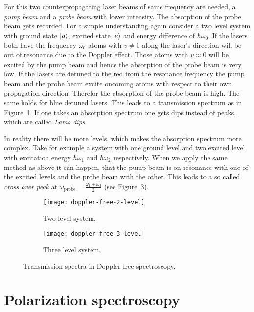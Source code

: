 \documentclass[11pt, english, fleqn, DIV=15, headinclude, BCOR=2cm]{scrreprt}
\begin{document}
For this two counterpropagating laser beams of same frequency are needed, a
\emph{pump beam} and a \emph{probe beam} with lower intensity. The absorption
of the probe beam gets recorded. For a simple understanding again consider a
two level system with ground state $\ket{g}$, excited state $\ket{e}$ and
energy difference of $\hbar\omega_0$. If the lasers both have the frequency
$\omega_0$ atoms with $v\neq0$ along the laser's direction will be out of
resonance due to the Doppler effect. Those atoms with $v\approx 0$ will be
excited by the pump beam and hence the absorption of the probe beam is very
low. If the lasers are detuned to the red from the resonance frequency the pump
beam and the probe beam excite oncoming atoms with respect to their own
propagation direction. Therefor the absorption of the probe beam is high.
The same holds for blue detuned lasers. This leads to a transmission spectrum as
in Figure~\ref{fig:doppler-free-2-level}. If one takes an absorption
spectrum one gets dips instead of peaks, which are called \emph{Lamb dips}.

In reality there will be more levels, which makes the absorption spectrum more
complex. Take for example a system with one ground level and two excited level
with excitation energy $\hbar\omega_1$ and $\hbar\omega_2$ respectively. When
we apply the same method as above it can happen, that the pump beam is on
resonance with one of the excited levels and the probe beam with the other.
This leads to a so called \emph{cross over peak} at $\omega_\text{probe} =
\frac{\omega_1+\omega_2}2$ (see Figure~\ref{fig:doppler-free-3-level}).

\begin{figure}
    \begin{subfigure}{.5\textwidth}
        \centering
        \texttt{[image: doppler-free-2-level]}
        \caption{%
            Two level system.
        }
        \label{fig:doppler-free-2-level}
    \end{subfigure}
    \hfill
    \begin{subfigure}{.5\textwidth}
        \centering
        \texttt{[image: doppler-free-3-level]}
        \caption{%
            Three level system.
        }
        \label{fig:doppler-free-3-level}
    \end{subfigure}
    \caption{%
        Transmission spectra in Doppler-free spectroscopy.
    }
\end{figure}

\section{Polarization spectroscopy}
\end{document}
